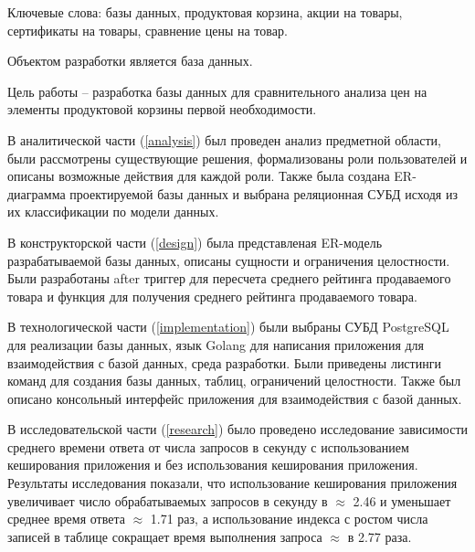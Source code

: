 \begin{essay}{}
	Ключевые слова: базы данных, продуктовая корзина, акции на товары, сертификаты на товары, сравнение цены на товар.
	
	Объектом разработки является база данных.
	
	Цель работы -- разработка базы данных для сравнительного анализа цен на элементы продуктовой корзины первой необходимости.
	
	В аналитической части (\ref{analysis}) был проведен анализ предметной области, были рассмотрены существующие решения, формализованы роли пользователей и описаны возможные действия для каждой роли. Также была создана ER-диаграмма проектируемой базы данных и выбрана реляционная СУБД исходя из их классификации по модели данных.
	
	В конструкторской  части (\ref{design}) была представленая ER-модель разрабатываемой базы данных, описаны сущности и ограничения целостности. Были разработаны after триггер для пересчета среднего рейтинга продаваемого товара и функция для получения среднего рейтинга продаваемого товара.
	
	В технологической части (\ref{implementation}) были выбраны СУБД PostgreSQL для реализации базы данных, язык Golang для написания приложения для взаимодействия с базой данных, среда разработки. Были приведены листинги команд для создания базы данных, таблиц, ограничений целостности. Также был описано консольный интерфейс приложения для взаимодействия с базой данных.
	
	В исследовательской части (\ref{research}) было проведено исследование зависимости среднего времени ответа от числа запросов в секунду с использованием кеширования приложения и без использования кеширования приложения. Результаты исследования показали, что использование кеширования приложения увеличивает число обрабатываемых запросов в секунду в  $\approx$ 2.46 и уменьшает среднее время ответа $\approx$ 1.71 раз, а использование индекса с ростом числа записей в таблице сокращает время выполнения запроса $\approx$ в 2.77 раза.
\end{essay}